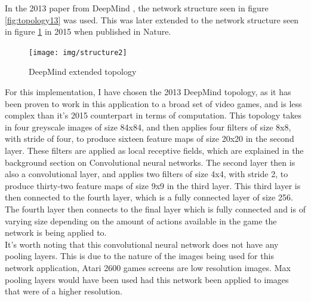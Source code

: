 \documentclass[10pt]{article}
\begin{document}
		In the 2013 paper from DeepMind \cite{ataridrl}, the network structure seen in figure \ref{fig:topology13} was used. This was later extended to the network structure seen in figure \ref{fig:topology15} in 2015 when published in Nature.\\
		
		\begin{figure}[h]				
			\texttt{[image: img/structure2]}
			\centering
			\caption{DeepMind extended topology}
			\label{fig:topology15}
		\end{figure}
		
		For this implementation, I have chosen the 2013 DeepMind topology, as it has been proven to work in this application to a broad set of video games, and is less complex than it's 2015 counterpart in terms of computation. This topology takes in four greyscale images of size 84x84, and then applies four filters of size 8x8, with stride of four, to produce sixteen feature maps of size 20x20 in the second layer. These filters are applied as local receptive fields, which are explained in the background section on Convolutional neural networks. The second layer then is also a convolutional layer, and applies two filters of size 4x4, with stride 2, to produce thirty-two feature maps of size 9x9 in the third layer. This third layer is then connected to the fourth layer, which is a fully connected layer of size 256. The fourth layer then connects to the final layer which is fully connected and is of varying size depending on the amount of actions available in the game the network is being applied to.\\
		
		It's worth noting that this convolutional neural network does not have any pooling layers. This is due to the nature of the images being used for this network application, Atari 2600 games screens are low resolution images. Max pooling layers would have been used had this network been applied to images that were of a higher resolution.\\
		
\end{document}
